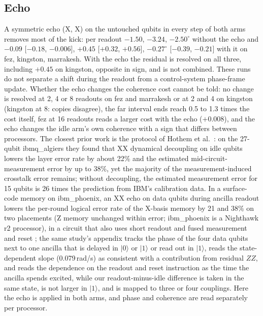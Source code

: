 \documentclass[reprint,amsmath,amssymb,aps,superscriptaddress,nofootinbib]{revtex4-2}
\begin{document}
\subsection{Echo}\label{sec:echo}

A symmetric echo (X, X) on the untouched qubits in every step of both arms removes most of the kick: per readout $-1.50$, $-3.24$, $-2.50^\circ$ without the echo and $-0.09$ [$-0.18$, $-0.006$], $+0.45$ [$+0.32$, $+0.56$], $-0.27^\circ$ [$-0.39$, $-0.21$] with it on fez, kingston, marrakesh. With the echo the residual is resolved on all three, including $+0.45$ on kingston, opposite in sign, and is not combined. These runs do not separate a shift during the readout from a control-system phase-frame update. Whether the echo changes the coherence cost cannot be told: no change is resolved at 2, 4 or 8 readouts on fez and marrakesh or at 2 and 4 on kingston (kingston at 8: copies disagree), the far interval ends reach 0.5 to 1.3 times the cost itself, fez at 16 readouts reads a larger cost with the echo ($+0.008$), and the echo changes the idle arm's own coherence with a sign that differs between processors. The closest prior work is the protocol of Hothem et al.\ \cite{Hothem2024}: on the 27-qubit ibmq\_algiers they found that XX dynamical decoupling on idle qubits lowers the layer error rate by about 22\% and the estimated mid-circuit-measurement error by up to 38\%, yet the majority of the measurement-induced crosstalk error remains; without decoupling, the estimated measurement error for 15 qubits is 26 times the prediction from IBM's calibration data. In a surface-code memory on ibm\_phoenix, an XX echo on data qubits during ancilla readout lowers the per-round logical error rate of the X-basis memory by 21 and 38\% on two placements (Z memory unchanged within error; ibm\_phoenix is a Nighthawk r2 processor), in a circuit that also uses short readout and fused measurement and reset \cite{Kan2026}; the same study's appendix tracks the phase of the four data qubits next to one ancilla that is delayed in $|0\rangle$ or $|1\rangle$ or read out in $|1\rangle$, reads the state-dependent slope (0.079\,rad/\textmu s) as consistent with a contribution from residual $ZZ$, and reads the dependence on the readout and reset instruction as the time the ancilla spends excited, while our readout-minus-idle difference is taken in the same state, is not larger in $|1\rangle$, and is mapped to three or four couplings. Here the echo is applied in both arms, and phase and coherence are read separately per processor.
\end{document}
